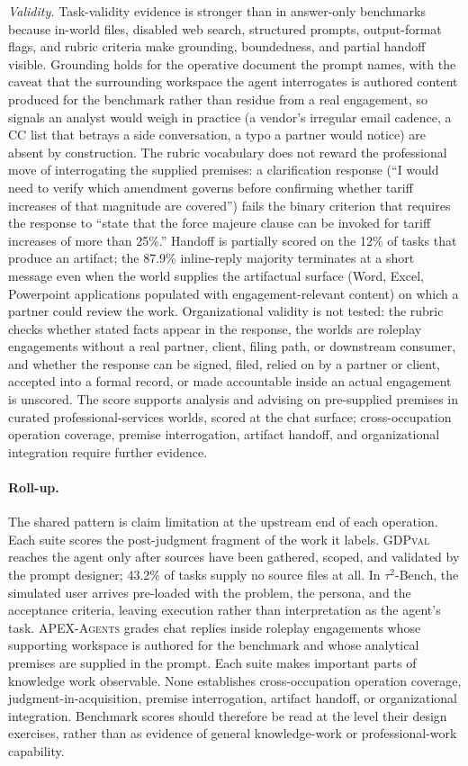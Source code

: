 \documentclass{article}
\begin{document}
\textit{Validity.}
Task-validity evidence is stronger than in answer-only benchmarks because in-world files, disabled web search, structured prompts, output-format flags, and rubric criteria make grounding, boundedness, and partial handoff visible.
Grounding holds for the operative document the prompt names, with the caveat that the surrounding workspace the agent interrogates is authored content produced for the benchmark rather than residue from a real engagement, so signals an analyst would weigh in practice (a vendor's irregular email cadence, a CC list that betrays a side conversation, a typo a partner would notice) are absent by construction.
The rubric vocabulary does not reward the professional move of interrogating the supplied premises: a clarification response (``I would need to verify which amendment governs before confirming whether tariff increases of that magnitude are covered'') fails the binary criterion that requires the response to ``state that the force majeure clause can be invoked for tariff increases of more than 25\%.''
Handoff is partially scored on the 12\% of tasks that produce an artifact; the 87.9\% inline-reply majority terminates at a short message even when the world supplies the artifactual surface (Word, Excel, Powerpoint applications populated with engagement-relevant content) on which a partner could review the work.
Organizational validity is not tested: the rubric checks whether stated facts appear in the response, the worlds are roleplay engagements without a real partner, client, filing path, or downstream consumer, and whether the response can be signed, filed, relied on by a partner or client, accepted into a formal record, or made accountable inside an actual engagement is unscored.
The score supports analysis and advising on pre-supplied premises in curated professional-services worlds, scored at the chat surface; cross-occupation operation coverage, premise interrogation, artifact handoff, and organizational integration require further evidence.

\paragraph{Roll-up.}\label{sec:rollup}
The shared pattern is claim limitation at the upstream end of each operation.
Each suite scores the post-judgment fragment of the work it labels.
\textsc{GDPval} reaches the agent only after sources have been gathered, scoped, and validated by the prompt designer; 43.2\% of tasks supply no source files at all.
In $\tau^2$-Bench, the simulated user arrives pre-loaded with the problem, the persona, and the acceptance criteria, leaving execution rather than interpretation as the agent's task.
\textsc{APEX-Agents} grades chat replies inside roleplay engagements whose supporting workspace is authored for the benchmark and whose analytical premises are supplied in the prompt.
Each suite makes important parts of knowledge work observable.
None establishes cross-occupation operation coverage, judgment-in-acquisition, premise interrogation, artifact handoff, or organizational integration.
Benchmark scores should therefore be read at the level their design exercises, rather than as evidence of general knowledge-work or professional-work capability.
\end{document}
